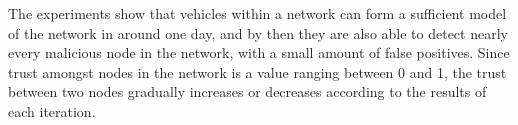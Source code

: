 \documentclass[conference]{IEEEtran}
\begin{document}
The experiments show that vehicles within a network can form a sufficient model of the network in around one day, and by then they are also able to detect nearly every malicious node in the network, with a small amount of false positives.
Since trust amongst nodes in the network is a value ranging between 0 and 1, the trust between two nodes gradually increases or decreases according to the results of each iteration.



%
%









%
%
%




\end{document}
